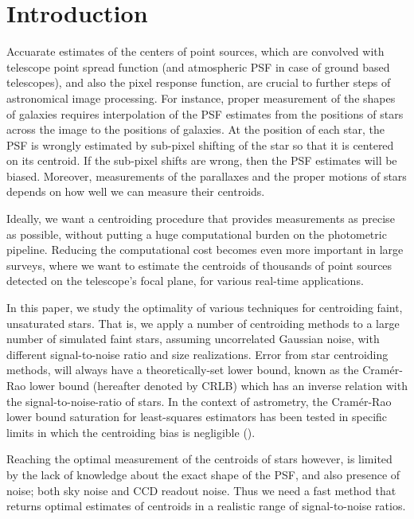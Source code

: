 \documentclass[12pt, preprint]{aastex}
\begin{document}

\section{Introduction}

Accuarate estimates of the centers of point
sources, which are convolved with telescope point spread function (and atmospheric PSF in case of
ground based telescopes), and also the pixel response function, are crucial to further steps of
astronomical image processing. For instance, proper measurement of the shapes of galaxies
requires interpolation of the PSF estimates from the positions of stars across the
image to the positions of galaxies. At the position of each star, the PSF is wrongly estimated by sub-pixel 
shifting of the star so that it is centered on its centroid. If the sub-pixel shifts are wrong, then 
the PSF estimates will be biased. Moreover, measurements of the parallaxes and the proper motions of stars
depends on how well we can measure their centroids. 

Ideally, we want a centroiding procedure that provides measurements as precise as possible,
without putting a huge computational burden on the photometric pipeline.
Reducing the computational cost becomes even more important in large surveys,
where we want to estimate the centroids of thousands of point sources detected
on the telescope's focal plane, for various real-time applications.

In this paper, we study the optimality of various techniques for centroiding 
faint, unsaturated stars. That is, we apply a number of centroiding methods 
to a large number of simulated faint stars, assuming uncorrelated Gaussian noise, 
with different signal-to-noise ratio and size realizations. Error from star 
centroiding methods, will always have a theoretically-set lower bound, 
known as the Cram\'{e}r-Rao lower bound (hereafter denoted by CRLB) which 
has an inverse relation with the signal-to-noise-ratio of stars. In the context 
of astrometry, the Cram\'{e}r-Rao lower bound saturation for least-squares 
estimators has been tested in specific limits in which the centroiding bias is 
negligible (\citealt{lobos}). 

Reaching the optimal measurement of the centroids of stars however, is limited
by the lack of knowledge about the exact shape of the PSF, and also presence of noise;
both sky noise and CCD readout noise. Thus we need a fast method that returns
optimal estimates of centroids in a realistic range of signal-to-noise ratios.
\end{document}
